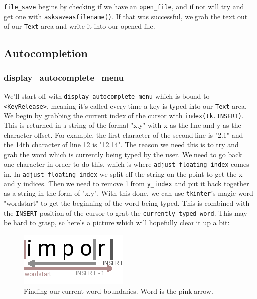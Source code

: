 \documentclass[a4paper,11pt,openany]{book}
\begin{document}
\vspace{5mm}

\lstinline[columns=fixed]{file_save} begins by checking if we have an \lstinline[columns=fixed]{open_file}, and if not will try and get one with \lstinline[columns=fixed]{asksaveasfilename()}. If that was successful, we grab the text out of our \lstinline[columns=fixed]{Text} area and write it into our opened file.

\subsection{Autocompletion}

\subsubsection{display\_autocomplete\_menu}

We'll start off with \lstinline[columns=fixed]{display_autocomplete_menu} which is bound to \lstinline[columns=fixed]{<KeyRelease>}, meaning it's called every time a key is typed into our \lstinline[columns=fixed]{Text} area. We begin by grabbing the current index of the cursor with \lstinline[columns=fixed]{index(tk.INSERT)}. This is returned in a string of the format "x.y" with x as the line and y as the character offset. For example, the first character of the second line is "2.1" and the 14th character of line 12 is "12.14". The reason we need this is to try and grab the word which is currently being typed by the user. We need to go back one character in order to do this, which is where \lstinline[columns=fixed]{adjust_floating_index} comes in. In \lstinline[columns=fixed]{adjust_floating_index} we split off the string on the point to get the x and y indices. Then we need to remove 1 from \lstinline[columns=fixed]{y_index} and put it back together as a string in the form of "x.y". With this done, we can use \lstinline[columns=fixed]{tkinter}'s magic word "wordstart" to get the beginning of the word being typed. This is combined with the \lstinline[columns=fixed]{INSERT} position of the cursor to grab the \lstinline[columns=fixed]{currently_typed_word}. This may be hard to grasp, so here's a picture which will hopefully clear it up a bit:

\begin{figure}[h]
\centering
\includegraphics{Ch6-ws}
\caption{Finding our current word boundaries. Word is the pink arrow.}
\end{figure}
\end{document}
